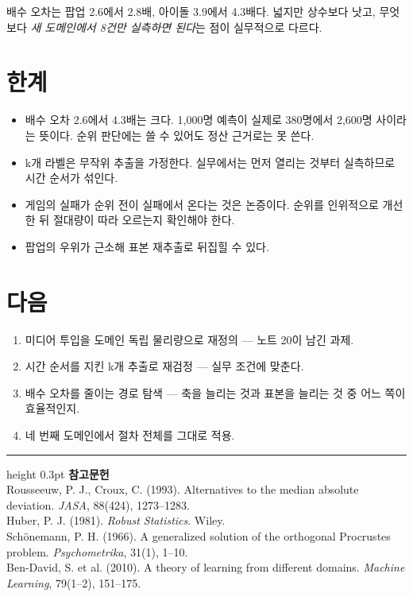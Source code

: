 \documentclass[10pt]{article}
\begin{document}
배수 오차는 팝업 2.6에서 2.8배, 아이돌 3.9에서 4.3배다. 넓지만 상수보다 낫고,
무엇보다 \emph{새 도메인에서 8건만 실측하면 된다}는 점이 실무적으로 다르다.

\section{한계}

\begin{itemize}[leftmargin=1.1em,itemsep=0.15em]
\item 배수 오차 2.6에서 4.3배는 크다. 1,000명 예측이 실제로 380명에서 2,600명
      사이라는 뜻이다. 순위 판단에는 쓸 수 있어도 정산 근거로는 못 쓴다.
\item k개 라벨은 무작위 추출을 가정한다. 실무에서는 먼저 열리는 것부터 실측하므로
      시간 순서가 섞인다.
\item 게임의 실패가 순위 전이 실패에서 온다는 것은 논증이다. 순위를 인위적으로
      개선한 뒤 절대량이 따라 오르는지 확인해야 한다.
\item 팝업의 우위가 근소해 표본 재추출로 뒤집힐 수 있다.
\end{itemize}

\section{다음}

\begin{enumerate}[leftmargin=1.3em,itemsep=0.15em]
\item 미디어 투입을 도메인 독립 물리량으로 재정의 --- 노트 20이 남긴 과제.
\item 시간 순서를 지킨 k개 추출로 재검정 --- 실무 조건에 맞춘다.
\item 배수 오차를 줄이는 경로 탐색 --- 축을 늘리는 것과 표본을 늘리는 것 중 어느
      쪽이 효율적인지.
\item 네 번째 도메인에서 절차 전체를 그대로 적용.
\end{enumerate}

\vspace{0.6em}
\hrule height 0.3pt
\vspace{0.5em}
{\footnotesize
\textbf{참고문헌}\\[0.3em]
Rousseeuw, P. J., Croux, C. (1993). Alternatives to the median absolute deviation.
\emph{JASA}, 88(424), 1273--1283.\\[0.15em]
Huber, P. J. (1981). \emph{Robust Statistics}. Wiley.\\[0.15em]
Schönemann, P. H. (1966). A generalized solution of the orthogonal Procrustes
problem. \emph{Psychometrika}, 31(1), 1--10.\\[0.15em]
Ben-David, S. et al. (2010). A theory of learning from different domains.
\emph{Machine Learning}, 79(1--2), 151--175.
}
\end{document}
